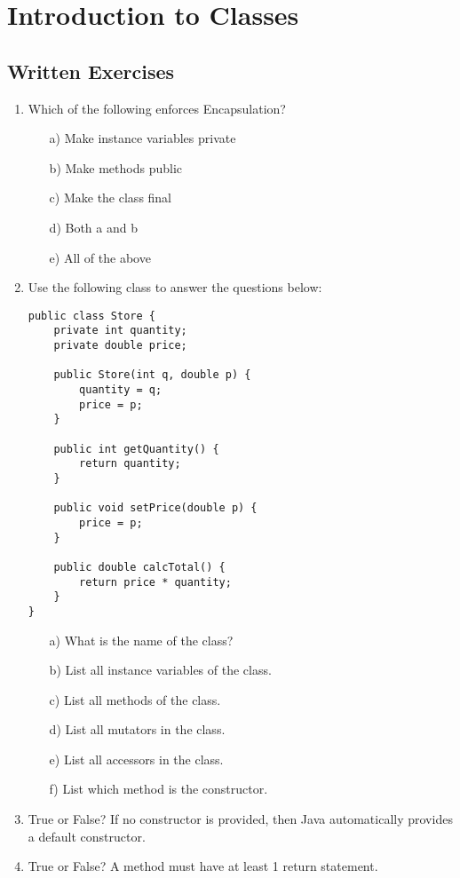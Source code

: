 \section{Introduction to Classes}

\subsection{Written Exercises}

\setcounter{counter}{1}
\begin{enumerate}[label={\arabic{counter}\addtocounter{counter}{1}}.]

\item Which of the following enforces Encapsulation?
\begin{enumerate}
\item[a)]Make instance variables private
\item[b)]Make methods public
\item[c)]Make the class final
\item[d)]Both a and b
\item[e)]All of the above
\end{enumerate}

\item Use the following class to answer the questions below:
\label{question:store}
\begin{lstlisting}
public class Store {
	private int quantity;
	private double price;

	public Store(int q, double p) {
		quantity = q;
		price = p;
	}

	public int getQuantity() {
		return quantity;
	}

	public void setPrice(double p) {
		price = p;
	}

	public double calcTotal() {
		return price * quantity;
	}
}
\end{lstlisting}
\begin{enumerate}
\item[a)]What is the name of the class?
\item[b)]List all instance variables of the class.
\item[c)]List all methods of the class.
\item[d)]List all mutators in the class.
\item[e)]List all accessors in the class.
\item[f)]List which method is the constructor.
\end{enumerate}

\item True or False? If no constructor is provided, then Java automatically provides a default constructor.

\item True or False? A method must have at least 1 return statement.

\end{enumerate}


